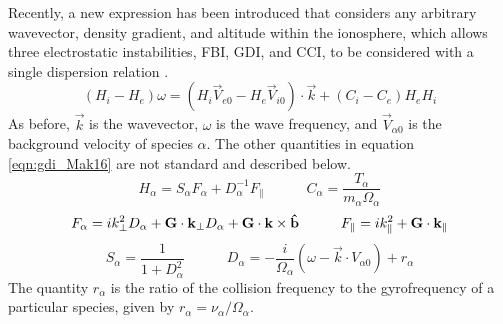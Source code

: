 Recently, a new expression has been introduced that considers any arbitrary wavevector, density gradient, and altitude within the ionosphere, which allows three electrostatic instabilities, FBI, GDI, and CCI, to be considered with a single dispersion relation \citep{Makarevich2016a}.
\begin{equation}
	\label{eqn:gdi_Mak16}
	(H_i-H_e)\omega = (H_i\vec{V}_{e0}-H_e\vec{V}_{i0})\cdot\vec{k}+(C_i-C_e)H_eH_i
\end{equation}
As before, \(\vec{k}\) is the wavevector, \(\omega\) is the wave frequency, and \(\vec{V}_{\alpha 0}\) is the background velocity of species \(\alpha\).  The other quantities in equation \ref{eqn:gdi_Mak16} are not standard and described below.
\begin{equation}
	H_\alpha = S_\alpha F_\alpha + D_\alpha^{-1} F_\parallel \quad\quad\quad 
	C_\alpha = \frac{T_\alpha}{m_\alpha \Omega_\alpha}
\end{equation}
\begin{equation}
	F_\alpha = i k_\perp^2 D_\alpha + \mathbf{G}\cdot\mathbf{k}_\perp D_\alpha + \mathbf{G}\cdot\mathbf{k}\times\mathbf{\hat{b}} \quad\quad\quad
	F_\parallel = i k_\parallel^2 + \mathbf{G}\cdot\mathbf{k}_\parallel
\end{equation}
\begin{equation}
	S_\alpha = \frac{1}{1+D_\alpha^2} \quad\quad\quad
	D_\alpha = -\frac{i}{\Omega_\alpha}(\omega-\vec{k}\cdot{V}_{\alpha 0})+r_\alpha
\end{equation}
The quantity \(r_\alpha\) is the ratio of the collision frequency to the gyrofrequency of a particular species, given by \(r_\alpha = \nu_\alpha/\Omega_\alpha\).  

